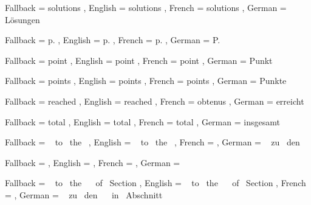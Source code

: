  {
  Fallback = solutions ,
  English  = solutions ,
  French   = solutions ,
  German   = L\"osungen
}

 {
  Fallback = p. ,
  English  = p. ,
  French   = p. ,
  German   = P.
}

 {
  Fallback = point ,
  English  = point ,
  French   = point ,
  German   = Punkt
}

 {
  Fallback = points ,
  English  = points ,
  French   = points ,
  German   = Punkte
}

 {
  Fallback = reached ,
  English  = reached ,
  French   = obtenus ,
  German   = erreicht
}

 {
  Fallback = total ,
  English  = total ,
  French   = total ,
  German   = insgesamt
}

 {
  Fallback = ~
             to~ the~  ,
  English  = ~
             to~ the~  ,
  French   =  ,
  German   = ~
             zu~ den~ 
}

 {
  Fallback =  ,
  English  =  ,
  French   =  ,
  German   = 
}

 {
  Fallback =  ~
             to~ the~  ~
             of~ Section \nobreakspace \ExerciseSection ,
  English  =  ~
             to~ the~  ~
             of~ Section \nobreakspace \ExerciseSection ,
  French   =  ,
  German   =  ~
             zu~ den~ ~
             in~ Abschnitt \nobreakspace \ExerciseSection
}


